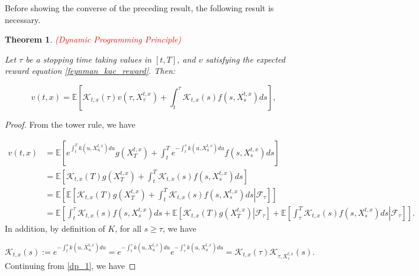 \documentclass{article}
\newtheorem{theorem}{Theorem}
\begin{document}
Before showing the converse of the preceding result, the following result is necessary. 

\begin{theorem} \label{thm:dp} \textcolor{red}{(Dynamic Programming Principle)}

Let $\tau$ be a stopping time taking values in $[t,T]$, and $v$ satisfying the expected reward equation \eqref{feynman_kac_reward}. Then:

\begin{equation}
v(t,x)=\mathbb{E}\left[\mathcal{K}_{t,x}(\tau)v(\tau,X_\tau^{t,x})+\int^\tau_t\mathcal{K}_{t,x}(s)f(s,X_s^{t,x})ds\right],
\end{equation}

\end{theorem}

\begin{proof}
From the tower rule, we have

\begin{equation} \label{dp_1}
\begin{aligned}
v(t,x)&=\mathbb{E}\left[e^{\int_t^Tk(u,X_u^{t,x})du}g(X_T^{t,x})+\int^T_te^{-\int^s_tk(u,X_u^{t,x})du}f(s,X_s^{t,x})ds\right]\\
&=\mathbb{E}\left[\mathcal{K}_{t,x}(T)g(X_T^{t,x})+\int^T_t\mathcal{K}_{t,x}(s)f(s,X_s^{t,x})ds\right]\\
&=\left.\mathbb{E}\left[\mathbb{E}\left[\mathcal{K}_{t,x}(T)g(X_T^{t,x})+\int^T_t\mathcal{K}_{t,x}(s)f(s,X_s^{t,x})ds\right\vert\mathcal{F}_\tau\right]\right]\\
&=\mathbb{E}\left[\int^\tau_t\mathcal{K}_{t,x}(s)f(s,X_s^{t,x})ds+\left.\mathbb{E}\left[\mathcal{K}_{t,x}(T)g(X_T^{t,x})\right\vert\mathcal{F}_\tau\right]+\left.\mathbb{E}\left[\int^T_\tau \mathcal{K}_{t,x}(s)f(s,X_s^{t,x})ds\right\vert\mathcal{F}_\tau\right]\right].
\end{aligned}
\end{equation}
In addition, by definition of $K$, for all $s\geq \tau$, we have

\begin{equation*}
\mathcal{K}_{t,x}(s):=e^{-\int^s_tk(u,X_u^{t,x})du}=e^{-\int^\tau_tk(u,X_u^{t,x})du}e^{-\int^s_\tau k(u,X_u^{t,x})du}=\mathcal{K}_{t,x}(\tau)\mathcal{K}_{\tau,X_\tau^{t,x}}(s).
\end{equation*}
Continuing from \eqref{dp_1}, we have


\end{proof}
\end{document}
